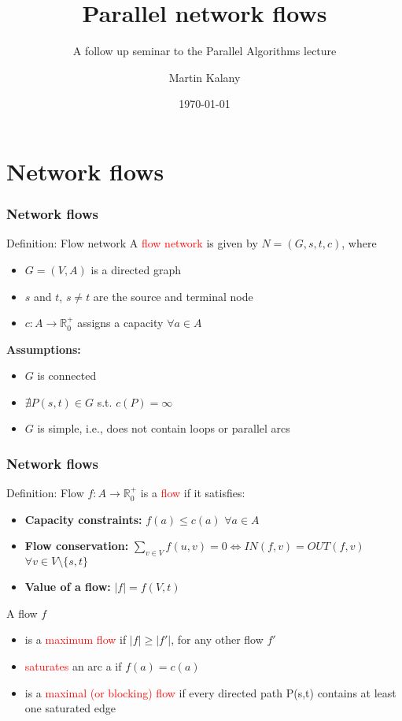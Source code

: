 \documentclass{beamer}
\title{Parallel network flows}
\subtitle{A follow up seminar to the Parallel Algorithms lecture}
\author{Martin Kalany\inst{1} }
\institute
{
  \inst{1}
  Graduate student in Computer Science\\
  Vienna University of Technology\\
}
\date{\today}
\begin{document}

\frame{\titlepage}
	
\section{Network flows}
\begin{frame}
	\frametitle{Network flows}
    \begin{block}{Definition: Flow network}
    A \textcolor{red}{flow network}   is given by $N = (G,s,t,c)$, where
    \begin{itemize}
    		\item $G =(V,A)$ is a directed graph
    		\item $s$ and $t$, $s \neq t$ are the source and terminal node
    		\item $c:A\rightarrow \mathbb{R}_0^{+}$ assigns a capacity $\forall a \in A$
    \end{itemize}
    \end{block}
    \textbf{Assumptions:}
	\begin{itemize}
		\item $G$ is connected
		\item $\nexists P(s,t) \in G$ s.t. $c(P) = \infty$
		\item $G$ is simple, i.e., does not contain loops or parallel arcs
	\end{itemize}
\end{frame}
  
\begin{frame}[shrink]
	\frametitle{Network flows}
	\begin{block}{Definition: Flow}
	$f:A \rightarrow \mathbb{R}_0^{+}$ is a \textcolor{red}{flow} if it satisfies:
	\begin{itemize}
		\item \textbf{Capacity constraints:} $f(a) \leq c(a)$ $\forall a \in A$
		\item \textbf{Flow conservation:} 
		$ \sum\limits_{v \in V} f(u,v) =  0 \Leftrightarrow IN(f,v) = OUT(f,v)$ $\forall v \in V \setminus \{s,t\}$
		\item \textbf{Value of a flow:} $\lvert f\rvert = f(V,t)$ 
	\end{itemize}
	\end{block}
	
	\begin{block}{A flow $f$}
	\begin{itemize}
		\item is a \textcolor{red}{maximum flow} if $\lvert f\rvert \geq \lvert f'\rvert$, for any other flow $f'$
		\item \textcolor{red}{saturates} an arc a if $f(a) = c(a)$
		\item is a \textcolor{red}{maximal (or blocking) flow} if every directed path P(s,t) contains at least one saturated edge
	\end{itemize}
	\end{block}
\end{frame}
\end{document}

